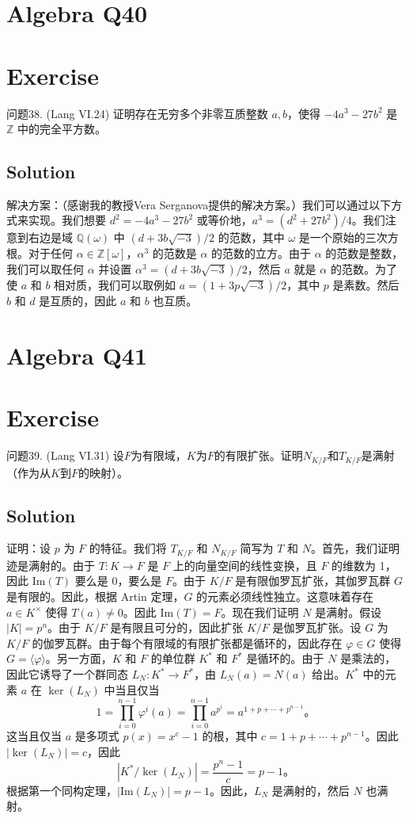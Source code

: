 \documentclass[12pt]{book}
\begin{document}
\section{Algebra Q40}
\section*{Exercise}
问题38. (Lang VI.24) 证明存在无穷多个非零互质整数 $a, b$，使得 $-4a^3 - 27b^2$ 是 $\mathbb{Z}$ 中的完全平方数。



\subsection*{Solution}
解决方案：（感谢我的教授Vera Serganova提供的解决方案。）我们可以通过以下方式来实现。我们想要 $d^2 = -4a^3 - 27b^2$ 或等价地，$a^3 = (d^2 + 27b^2)/4$。我们注意到右边是域 $\mathbb{Q}(\omega)$ 中 $(d+3b\sqrt{-3})/2$ 的范数，其中 $\omega$ 是一个原始的三次方根。对于任何 $\alpha \in \mathbb{Z}[\omega]$，$\alpha^3$ 的范数是 $\alpha$ 的范数的立方。由于 $\alpha$ 的范数是整数，我们可以取任何 $\alpha$ 并设置 $\alpha^3 = (d+3b\sqrt{-3})/2$，然后 $a$ 就是 $\alpha$ 的范数。为了使 $a$ 和 $b$ 相对质，我们可以取例如 $a = (1 + 3p\sqrt{-3})/2$，其中 $p$ 是素数。然后 $b$ 和 $d$ 是互质的，因此 $a$ 和 $b$ 也互质。
\newpage
\section{Algebra Q41}
\section*{Exercise}
问题39. (Lang VI.31) 设$F$为有限域，$K$为$F$的有限扩张。证明$N_{K/F}$和$T_{K/F}$是满射（作为从$K$到$F$的映射）。



\subsection*{Solution}
证明：设 $p$ 为 $F$ 的特征。我们将 $T_{K/F}$ 和 $N_{K/F}$ 简写为 $T$ 和 $N$。首先，我们证明迹是满射的。由于 $T: K \to F$ 是 $F$ 上的向量空间的线性变换，且 $F$ 的维数为 1，因此 $\text{Im}(T)$ 要么是 $0$，要么是 $F$。由于 $K/F$ 是有限伽罗瓦扩张，其伽罗瓦群 $G$ 是有限的。因此，根据 Artin 定理，$G$ 的元素必须线性独立。这意味着存在 $a \in K^\times$ 使得 $T(a) \neq 0$。因此 $\text{Im}(T) = F$。现在我们证明 $N$ 是满射。假设 $|K| = p^n$。由于 $K/F$ 是有限且可分的，因此扩张 $K/F$ 是伽罗瓦扩张。设 $G$ 为 $K/F$ 的伽罗瓦群。由于每个有限域的有限扩张都是循环的，因此存在 $\varphi \in G$ 使得 $G = \langle \varphi \rangle$。另一方面，$K$ 和 $F$ 的单位群 $K^*$ 和 $F^*$ 是循环的。由于 $N$ 是乘法的，因此它诱导了一个群同态 $L_N: K^* \to F^*$，由 $L_N(a) = N(a)$ 给出。$K^*$ 中的元素 $a$ 在 $\ker(L_N)$ 中当且仅当 $$1 = \prod_{i=0}^{n-1} \varphi^i(a) = \prod_{i=0}^{n-1} a^{p^i} = a^{1 + p + \cdots + p^{n-1}}。$$ 这当且仅当 $a$ 是多项式 $p(x) = x^c - 1$ 的根，其中 $c = 1 + p + \cdots + p^{n-1}$。因此 $|\ker(L_N)| = c$，因此 $$|K^*/\ker(L_N)| = \frac{p^n - 1}{c} = p - 1。$$ 根据第一个同构定理，$|\text{Im}(L_N)| = p - 1$。因此，$L_N$ 是满射的，然后 $N$ 也满射。
\newpage
\end{document}
